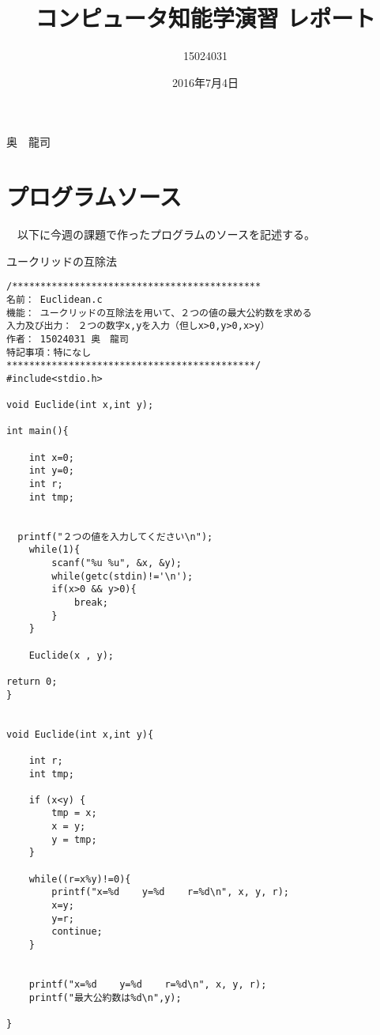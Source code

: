 \documentclass[a4j,titlepage]{jarticle}
\begin{document}

\title{コンピュータ知能学演習 レポート}

\author{15024031}{奥　龍司}

\date{2016年7月4日}
\maketitle



\section{プログラムソース}
　以下に今週の課題で作ったプログラムのソースを記述する。
\begin{breakitembox}[l]{ユークリッドの互除法} \small
\begin{verbatim}
/********************************************
名前： Euclidean.c
機能： ユークリッドの互除法を用いて、２つの値の最大公約数を求める
入力及び出力： ２つの数字x,yを入力（但しx>0,y>0,x>y）
作者： 15024031 奥　龍司
特記事項：特になし
********************************************/
#include<stdio.h>

void Euclide(int x,int y);

int main(){
    
    int x=0;
    int y=0;
    int r;
    int tmp;
    
  
  printf("２つの値を入力してください\n");
    while(1){
        scanf("%u %u", &x, &y);
        while(getc(stdin)!='\n');
        if(x>0 && y>0){
            break;
        }
    }
    
    Euclide(x , y);
    
return 0;
}


void Euclide(int x,int y){
    
    int r;
    int tmp;
    
    if (x<y) {
        tmp = x;
        x = y;
        y = tmp;
    }
    
    while((r=x%y)!=0){
        printf("x=%d    y=%d    r=%d\n", x, y, r);
        x=y;
        y=r;
        continue;
    }
    
    
    printf("x=%d    y=%d    r=%d\n", x, y, r);
    printf("最大公約数は%d\n",y);

}
\end{verbatim}
\end{breakitembox}
\end{document}

